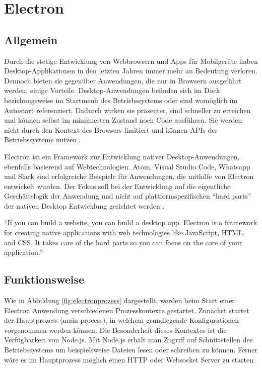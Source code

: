 \section{Electron}
\subsection{Allgemein}

Durch die stetige Entwicklung von Webbrowsern und Apps für Mobilgeräte haben Desktop-Applikationen in den letzten Jahren immer mehr an Bedeutung verloren.
Dennoch bieten sie gegenüber Anwendungen, die nur in Browsern ausgeführt werden, einige Vorteile.
Desktop-Anwendungen befinden sich im Dock beziehungsweise im Startmenü des Betriebssystems oder sind womöglich im Autostart referenziert.
Dadurch wirken sie präsenter, sind schneller zu erreichen und können selbst im minimierten Zustand noch Code ausführen.
Sie werden nicht durch den Kontext des Browsers limitiert und können APIs der Betriebssysteme nutzen \cite{Build58:online}.

Electron ist ein Framework zur Entwicklung nativer Desktop-Anwendungen, ebenfalls basierend auf Webtechnologien.
Atom, Visual Studio Code, Whatsapp und Slack sind erfolgreiche Beispiele für Anwendungen, die mithilfe von Electron
entwickelt wurden.
Der Fokus soll bei der Entwicklung auf die eigentliche Geschäftslogik der Anwendung und nicht auf plattformspezifischen
``hard parts'' der nativen Desktop Entwicklung gerichtet werden \cite{Elect57:online}.

\vspace{0.3cm}
``If you can build a website, you can build a desktop app. Electron is a framework for creating native applications
with web technologies like JavaScript, HTML, and CSS. It takes care of the hard parts so you can focus on the core of
your application.''
\cite{Elect57:online}

\subsection{Funktionsweise}
\label{sec:functionsweise}


Wie in Abbildung \ref{fig:electronprozess} dargestellt, werden beim Start einer
Electron Anwendung verschiedenen Prozesskontexte gestartet.
Zunächst startet der Hauptprozess (main process), in welchem grundlegende Konfigurationen vorgenommen werden können.
Die Besonderheit dieses Kontextes ist die Verfügbarkeit von Node.js.
Mit Node.js erhält man Zugriff auf Schnittstellen des Betriebssystems um beispielsweise Dateien lesen oder schreiben zu können.
Ferner wäre es im Hauptprozess möglich einen HTTP oder Websocket Server zu starten.


